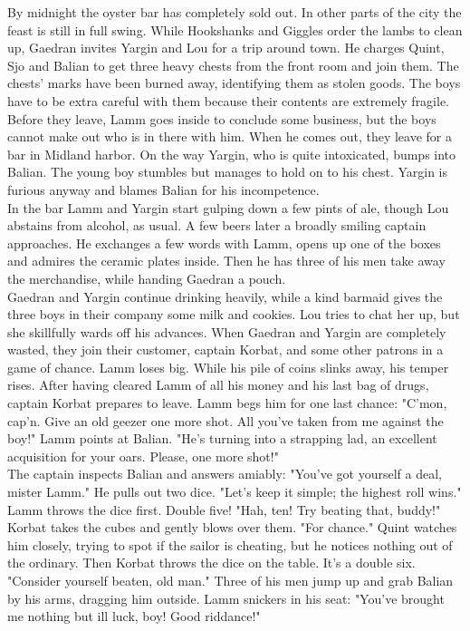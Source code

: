By midnight the oyster bar has completely sold out. In other parts of the city the feast is still in full swing. While Hookshanks and Giggles order the lambs to clean up, Gaedran invites Yargin and Lou for a trip around town. He charges Quint, Sjo and Balian to get three heavy chests from the front room and join them. The chests' marks have been burned away, identifying them as stolen goods. The boys have to be extra careful with them because their contents are extremely fragile.\\

Before they leave, Lamm goes inside to conclude some business, but the boys cannot make out who is in there with him. When he comes out, they leave for a bar in Midland harbor. On the way Yargin, who is quite intoxicated, bumps into Balian. The young boy stumbles but manages to hold on to his chest. Yargin is furious anyway and blames Balian for his incompetence.\\

In the bar Lamm and Yargin start gulping down a few pints of ale, though Lou abstains from alcohol, as usual. A few beers later a broadly smiling captain approaches. He exchanges a few words with Lamm, opens up one of the boxes and admires the ceramic plates inside. Then he has three of his men take away the merchandise, while handing Gaedran a pouch.\\

Gaedran and Yargin continue drinking heavily, while a kind barmaid gives the three boys in their company some milk and cookies. Lou tries to chat her up, but she skillfully wards off his advances. When Gaedran and Yargin are completely wasted, they join their customer, captain Korbat, and some other patrons in a game of chance. Lamm loses big. While his pile of coins slinks away, his temper rises. After having cleared Lamm of all his money and his last bag of drugs, captain Korbat prepares to leave. Lamm begs him for one last chance: "C'mon, cap'n. Give an old geezer one more shot. All you've taken from me against the boy!" Lamm points at Balian. "He's turning into a strapping lad, an excellent acquisition for your oars. Please, one more shot!"\\

The captain inspects Balian and answers amiably: "You've got yourself a deal, mister Lamm." He pulls out two dice. "Let's keep it simple; the highest roll wins."\\

Lamm throws the dice first. Double five! "Hah, ten! Try beating that, buddy!" Korbat takes the cubes and gently blows over them. "For chance." Quint watches him closely, trying to spot if the sailor is cheating, but he notices nothing out of the ordinary. Then Korbat throws the dice on the table. It's a double six. "Consider yourself beaten, old man." Three of his men jump up and grab Balian by his arms, dragging him outside. Lamm snickers in his seat: "You've brought me nothing but ill luck, boy! Good riddance!"\\

